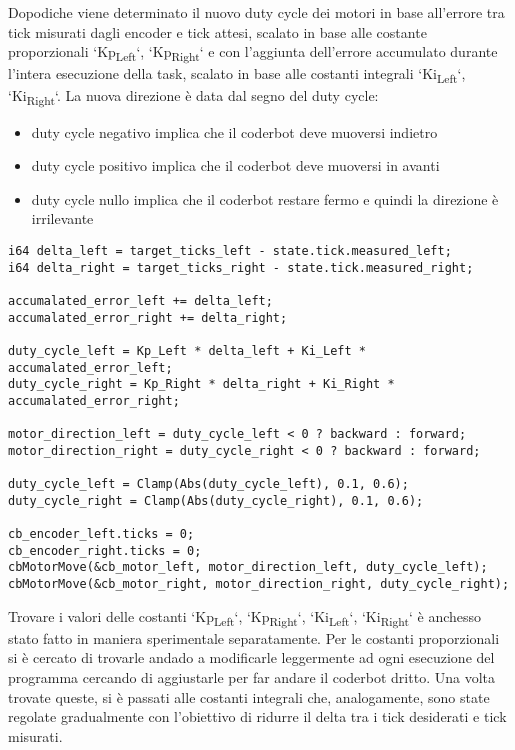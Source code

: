 \documentclass[11pt]{article}
\begin{document}
Dopodiche viene determinato il nuovo duty cycle dei motori in base all'errore tra tick misurati dagli encoder e tick attesi, scalato in base alle costante proporzionali `Kp\textsubscript{Left}`, `Kp\textsubscript{Right}` e con l'aggiunta dell'errore accumulato durante l'intera esecuzione della task, scalato in base alle costanti integrali `Ki\textsubscript{Left}`, `Ki\textsubscript{Right}`.
La nuova direzione è data dal segno del duty cycle:
\begin{itemize}
\item duty cycle negativo implica che il coderbot deve muoversi indietro
\item duty cycle positivo implica che il coderbot deve muoversi in avanti
\item duty cycle nullo implica che il coderbot restare fermo e quindi la direzione è irrilevante
\end{itemize}
\begin{verbatim}
i64 delta_left = target_ticks_left - state.tick.measured_left;
i64 delta_right = target_ticks_right - state.tick.measured_right;

accumalated_error_left += delta_left;
accumalated_error_right += delta_right;

duty_cycle_left = Kp_Left * delta_left + Ki_Left * accumalated_error_left;
duty_cycle_right = Kp_Right * delta_right + Ki_Right * accumalated_error_right;

motor_direction_left = duty_cycle_left < 0 ? backward : forward;
motor_direction_right = duty_cycle_right < 0 ? backward : forward;

duty_cycle_left = Clamp(Abs(duty_cycle_left), 0.1, 0.6);
duty_cycle_right = Clamp(Abs(duty_cycle_right), 0.1, 0.6);

cb_encoder_left.ticks = 0;
cb_encoder_right.ticks = 0;
cbMotorMove(&cb_motor_left, motor_direction_left, duty_cycle_left);
cbMotorMove(&cb_motor_right, motor_direction_right, duty_cycle_right);
\end{verbatim}

Trovare i valori delle costanti `Kp\textsubscript{Left}`, `Kp\textsubscript{Right}`, `Ki\textsubscript{Left}`, `Ki\textsubscript{Right}` è anchesso stato fatto in maniera sperimentale separatamente.
Per le costanti proporzionali si è cercato di trovarle andado a modificarle leggermente ad ogni esecuzione del programma cercando di aggiustarle per far andare il coderbot dritto. Una volta trovate queste, si è passati alle costanti integrali che, analogamente, sono state regolate gradualmente con l'obiettivo di ridurre il delta tra i tick desiderati e tick misurati.
\end{document}
